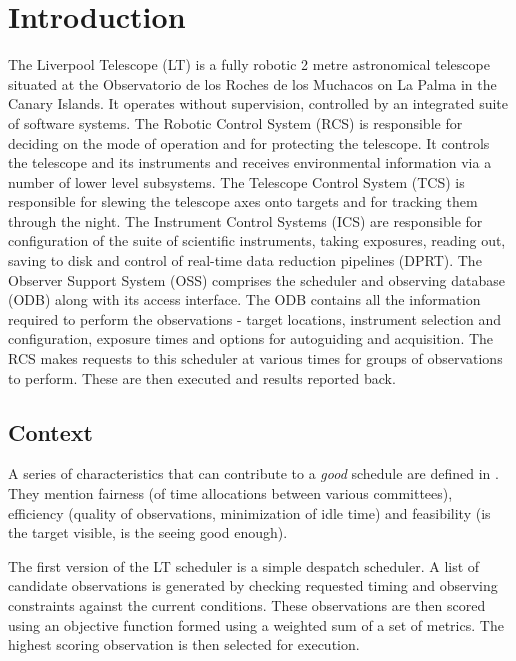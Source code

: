 \documentclass[12pt,a4paper]{article}
\begin{document}
%
\newpage
\section{Introduction}

The Liverpool Telescope (LT) \citep{steele04lt} is a fully robotic 2 metre astronomical telescope situated at the Observatorio de los Roches de los Muchacos on La Palma in the Canary Islands. It operates without supervision, controlled by an integrated suite of software systems. The Robotic Control System (RCS) is responsible for deciding on the mode of operation and for protecting the telescope. It controls the telescope and its instruments and receives environmental information via a number of lower level subsystems. The Telescope Control System (TCS) is responsible for slewing the telescope axes onto targets and for tracking them through the night. The Instrument Control Systems (ICS) are responsible for configuration of the suite of scientific instruments, taking exposures, reading out, saving to disk and control of real-time data reduction pipelines (DPRT). The Observer Support System (OSS) comprises the scheduler and observing database (ODB) along with its access interface. The ODB contains all the information required to perform the observations - target locations, instrument selection and configuration, exposure times and options for autoguiding and acquisition. The RCS makes requests to this scheduler at various times for groups of observations to perform. These are then executed and results reported back.

\subsection{Context}

A  series of characteristics that can contribute to a \emph{good} schedule are defined in \citep{steele97control}. They mention fairness (of time allocations between various committees), efficiency (quality of observations, minimization of idle time) and feasibility (is the target visible, is the seeing good enough). 

The first version of the LT scheduler \citep{fraser04scheduling} is a simple despatch scheduler. A list of candidate observations is generated by checking requested timing and observing constraints against the current conditions. These observations are then scored using an objective function formed using a weighted sum of a set of metrics. The highest scoring observation is then selected for execution.
\end{document}
